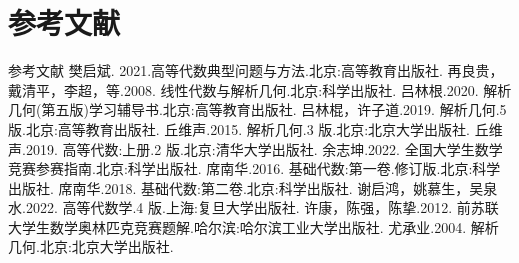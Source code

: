 \chapter*{参考文献}


\hypertarget{source-p324}{}
参考文献
樊启斌. 2021.高等代数典型问题与方法.北京:高等教育出版社.
再良贵，戴清平，李超，等.2008. 线性代数与解析几何.北京:科学出版社.
吕林根.2020. 解析几何(第五版)学习辅导书.北京:高等教育出版社.
吕林棍，许子道.2019. 解析几何.5 版.北京:高等教育出版社.
丘维声.2015. 解析几何.3 版.北京:北京大学出版社.
丘维声.2019. 高等代数:上册.2 版.北京:清华大学出版社.
余志坤.2022. 全国大学生数学竞赛参赛指南.北京:科学出版社.
席南华.2016. 基础代数:第一卷.修订版.北京:科学出版社.
席南华.2018. 基础代数:第二卷.北京:科学出版社.
谢启鸿，姚慕生，吴泉水.2022. 高等代数学.4 版.上海:复旦大学出版社.
许康，陈强，陈挚.2012. 前苏联大学生数学奥林匹克竞赛题解.哈尔滨:哈尔滨工业大学出版社.
尤承业.2004. 解析几何.北京:北京大学出版社.
